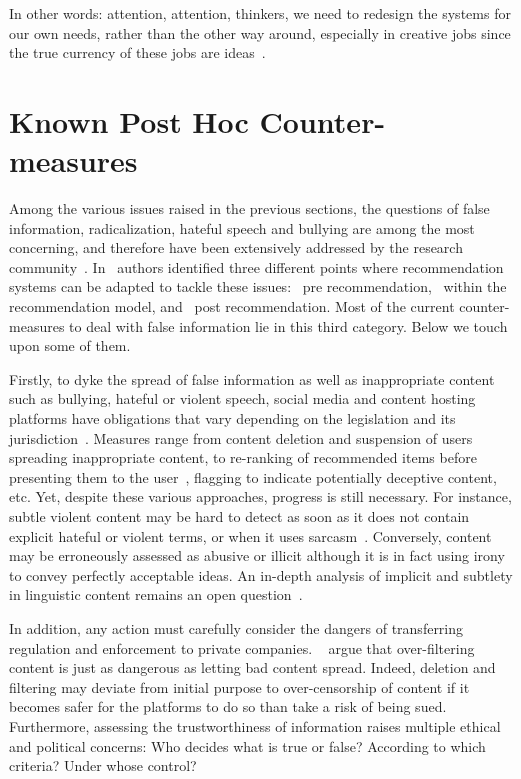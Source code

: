 \documentclass[10pt]{article}
\newcommand*\circled[1]{\tikz[baseline=(char.base)]{\footnotesize
    \node[shape=circle,draw,fill=black,text=white,inner sep=1pt] (char) {#1};}}
\begin{document}
In other words: attention, attention, thinkers, we need to redesign the systems for our own needs, rather than the other way around, 
especially in creative jobs since the true currency of these jobs are ideas~\cite{smith_attention_2018}.


\section{Known Post Hoc Counter-measures}\label{posthoc-measures}

Among the various issues raised in the previous sections, the questions of false information, radicalization, hateful speech and bullying are among the most concerning, and therefore have been extensively addressed by the research community~\cite{sharma_combating_2019}.
In~\cite{fernandez_analysing_2021} authors identified three different points where recommendation systems can be adapted to tackle these issues: \circled{1}~pre recommendation, \circled{2}~within the recommendation model, and \circled{3}~post recommendation. 
Most of the current counter-measures to deal with false information lie in this third category. Below we touch upon some of them.

Firstly, to dyke the spread of false information as well as inappropriate content such as bullying, hateful or violent speech, social media and content hosting platforms have obligations that vary depending on the legislation and its jurisdiction~\cite{funke_guide_nodate}.
Measures range from content deletion and suspension of users spreading inappropriate content, to re-ranking of recommended items before presenting them to the user~\cite{fernandez_analysing_2021}, flagging to indicate potentially deceptive content, etc.
Yet, despite these various approaches,
progress is still necessary.
For instance, subtle violent content may be hard to detect as soon as it does not contain explicit hateful or violent terms, or when it uses sarcasm~\cite{ocampo-etal-2023-depth}.
Conversely, content may be erroneously assessed as abusive or illicit although it is in fact using irony to convey perfectly acceptable ideas. An in-depth analysis of implicit and subtlety in linguistic content remains an open question~\cite{ocampo-etal-2023-depth}.

In addition, any action must carefully consider the dangers of transferring regulation and enforcement to private companies.
~\cite{stark2020algorithms} argue that over-filtering content is just as dangerous as letting bad content spread.
Indeed, deletion and filtering may deviate from initial purpose to over-censorship of content if it becomes safer for the platforms to do so than take a risk of being sued.
Furthermore, assessing the trustworthiness of information raises multiple ethical and political concerns: Who decides what is true or false? According to which criteria? Under whose control? %
\end{document}
